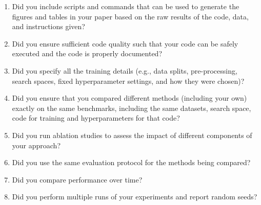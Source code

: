 \documentclass[11pt]{article}
\begin{document}
\begin{enumerate}
\begin{enumerate}
  \item Did you include scripts and commands that can be used to generate the
    figures and tables in your paper based on the raw results of the code, data,
    and instructions given?
  \item Did you ensure sufficient code quality such that your code can be safely
    executed and the code is properly documented?
  \item Did you specify all the training details (e.g., data splits,
    pre-processing, search spaces, fixed hyperparameter settings, and how they
    were chosen)?
  \item Did you ensure that you compared different methods (including your own)
    exactly on the same benchmarks, including the same datasets, search space,
    code for training and hyperparameters for that code?
  \item Did you run ablation studies to assess the impact of different
    components of your approach?
  \item Did you use the same evaluation protocol for the methods being compared?
  \item Did you compare performance over time?
  \item Did you perform multiple runs of your experiments and report random seeds?
\end{enumerate}
\end{enumerate}
\end{document}
